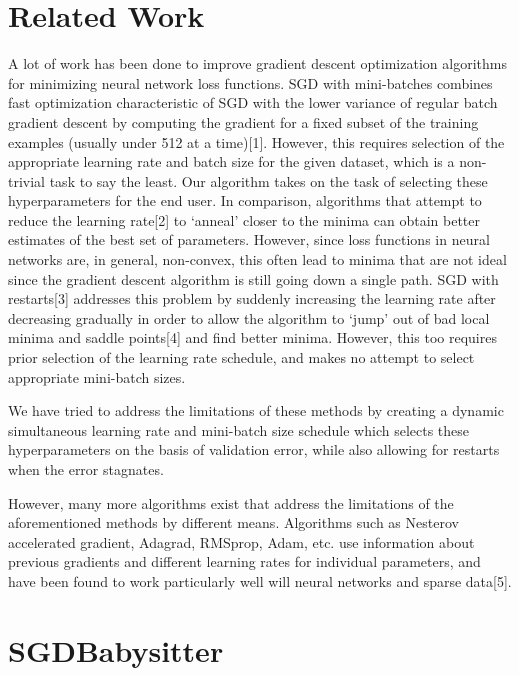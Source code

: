 \documentclass{article}
\begin{document}
\section{Related Work}
\par A lot of work has been done to improve gradient descent optimization algorithms for minimizing neural network loss functions. SGD with mini-batches combines fast optimization characteristic of SGD with the lower variance of regular batch gradient descent by computing the gradient for a fixed subset of the training examples (usually under 512 at a time)[1]. However, this requires selection of the appropriate learning rate and batch size for the given dataset, which is a non-trivial task to say the least. Our algorithm takes on the task of selecting these hyperparameters for the end user.  In comparison, algorithms that attempt to reduce the learning rate[2] to `anneal' closer to the minima can obtain better estimates of the best set of parameters. However, since loss functions in neural networks are, in general, non-convex, this often lead to minima that are not ideal since the gradient descent algorithm is still going down a single path. SGD with restarts[3] addresses this problem by suddenly increasing the learning rate after decreasing gradually in order to allow the algorithm to `jump' out of bad local minima and saddle points[4] and find better minima. However, this too requires prior selection of the learning rate schedule, and makes no attempt to select appropriate mini-batch sizes. 
\par We have tried to address the limitations of these methods by creating a dynamic simultaneous learning rate and mini-batch size schedule which selects these hyperparameters on the basis of validation error, while also allowing for restarts when the error stagnates. 
\par However, many more algorithms exist that address the limitations of the aforementioned methods by different means. Algorithms such as Nesterov accelerated gradient, Adagrad, RMSprop, Adam, etc. use information about previous gradients and different learning rates for individual parameters, and have been found to work particularly well will neural networks and sparse data[5]. 


\section{SGDBabysitter} 
\end{document}
